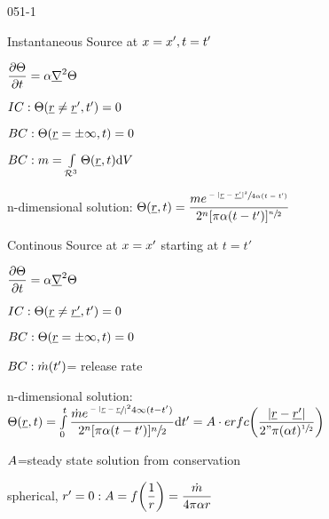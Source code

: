 \begin{mitframe}{051-1}
\begin{listone}
\item Instantaneous Source at $\disp=\disp', t=t'$

		\begin{listtwo}
        	\item $\dfrac{\partial\dimltemp}{\partial{t}}=\tdiff\gradop^2\dimltemp$
            \item $\mominertia\conc:\dimltemp(\uline{\pos}\neq\uline{\pos}',t')=0$
            \item $\exergy\conc:\dimltemp(\uline{\pos}=\pm\infty,t)=0$
            \item $\exergy\conc:\mass=\int\limits_{\surfreac^3}\dimltemp(\uline{\pos},t)\mathrm{d}\vol$
            
            \item n-dimensional solution: $\dimltemp(\uline{\pos},t)=\dfrac{\mass\e^{\sfrac{-|\uline{\pos}-\uline{\pos'}|^2}{4\tdiff(t-t')}}}{2^n[\pi\tdiff(t-t')]^{\sfrac{n}{2}}}$
            
         \end{listtwo}
Continous Source at $\disp=\disp'$ starting at $t=t'$
			\begin{listtwo}
            		\item $\dfrac{\partial\dimltemp}{\partial{t}}=\tdiff\gradop^2\dimltemp$
                    \item $\mominertia\conc:\dimltemp(\uline{\pos}\neq\uline{\pos'},t')=0$
                    \item $\exergy\conc:\dimltemp(\uline{\pos}=\pm\infty,t)=0$
                    \item $\exergy\conc: \dot{\mass}(t')$= release rate
                    \item n-dimensional solution: $\dimltemp(\uline{\pos},t)=\int\limits_0^t\dfrac{\dot{\mass}\e^{\sfrac{-|\uline{\pos}-\uline{\pos}}|^2{4\infty(t-t')}}}{2^n[\pi\tdiff(t-t')]\sfrac{n}{2}}\mathrm{d}t'=\helmholtz\cdot\e\pos\fug{c}\bigg(\dfrac{|\uline{\pos}-\uline{\pos'}|}{2"\pi(\tdiff{t})^{\sfrac{1}{2}}}\bigg)$
                            \begin{listthree}
                                		\item $\helmholtz$=steady state solution from conservation
                                        \item spherical, $\pos'=0: \helmholtz=\fug\bigg(\dfrac{1}{\pos}\bigg)=\dfrac{\dot{\mass}}{4\pi\tdiff\pos}$
                                \end{listthree}
            
            \end{listtwo}
\end{listone}           
\end{mitframe}